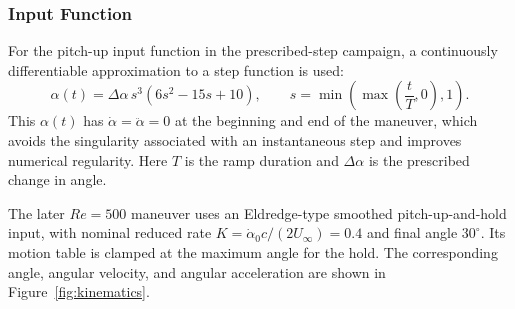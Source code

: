 \FloatBarrier
\subsubsection{Input Function}
For the pitch-up input function in the prescribed-step campaign, a continuously differentiable approximation to a step function is used:
\begin{equation}
\alpha(t)=\Delta\alpha\,s^3(6s^2-15s+10),
\qquad s=\min\!\left(\max\!\left(\frac{t}{T},0\right),1\right).
\end{equation}
This $\alpha(t)$ has $\dot\alpha=\ddot\alpha=0$ at the beginning and end of the maneuver, which avoids the singularity associated with an instantaneous step and improves numerical regularity. Here $T$ is the ramp duration and $\Delta\alpha$ is the prescribed change in angle.

The later $Re=500$ maneuver uses an Eldredge-type smoothed pitch-up-and-hold input, with nominal reduced rate $K=\dot\alpha_0c/(2U_\infty)=0.4$ and final angle $30^\circ$. Its motion table is clamped at the maximum angle for the hold. The corresponding angle, angular velocity, and angular acceleration are shown in Figure~\ref{fig:kinematics}.

\FloatBarrier
